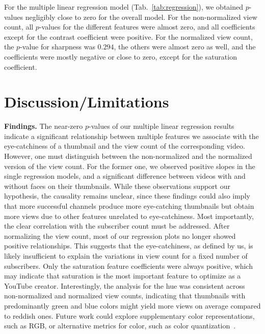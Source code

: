 \documentclass{article}
\begin{document}
For the multiple linear regression model (Tab.~\ref{tab:regression}), we obtained $p$-values negligibly close to zero for the overall model. For the non-normalized view count, all $p$-values for the different features were almost zero, and all coefficients except for the contrast coefficient were positive. For the normalized view count, the $p$-value for sharpness was $0.294$, the others were almost zero as well, and the coefficients were mostly negative or close to zero, except for the saturation coefficient.

\section{Discussion/Limitations}
\textbf{Findings.} The near-zero $p$-values of our multiple linear regression results indicate a significant relationship between multiple features we associate with the eye-catchiness of a thumbnail and the view count of the corresponding video. However, one must distinguish between the non-normalized and the normalized version of the view count. For the former one, we observed positive slopes in the single regression models, and a significant difference between videos with and without faces on their thumbnails. While these observations support our hypothesis, the causality remains unclear, since these findings could also imply that more successful channels produce more eye-catching thumbnails but obtain more views due to other features unrelated to eye-catchiness. Most importantly, the clear correlation with the subscriber count must be addressed. After normalizing the view count, most of our regression plots no longer showed positive relationships. This suggests that the eye-catchiness, as defined by us, is likely insufficient to explain the variations in view count for a fixed number of subscribers. Only the saturation feature coefficients were always positive, which may indicate that saturation is the most important feature to optimize as a YouTube creator. Interestingly, the analysis for the hue was consistent across non-normalized and normalized view counts, indicating that thumbnails with predominantly green and blue colors might yield more views on average compared to reddish ones. Future work could explore supplementary color representations, such as RGB, or alternative metrics for color, such as color quantization~\cite{colorquantization}.
\end{document}
